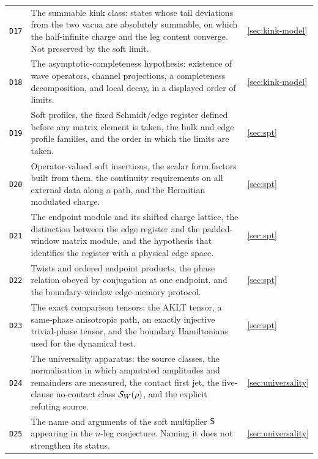 {\begin{longtable}{@{}p{}p{}p{}@{}}
\texttt{D17} & The summable kink class: states whose tail deviations from the
two vacua are absolutely summable, on which the half-infinite charge and the
leg content converge. Not preserved by the soft limit. & \cref{sec:kink-model}\\

\texttt{D18} & The asymptotic-completeness hypothesis: existence of wave
operators, channel projections, a completeness decomposition, and local decay,
in a displayed order of limits. & \cref{sec:kink-model}\\

\texttt{D19} & Soft profiles, the fixed Schmidt/edge register defined before
any matrix element is taken, the bulk and edge profile families, and the order
in which the limits are taken. & \cref{sec:spt}\\

\texttt{D20} & Operator-valued soft insertions, the scalar form factors built
from them, the continuity requirements on all external data along a path, and
the Hermitian modulated charge. & \cref{sec:spt}\\

\texttt{D21} & The endpoint module and its shifted charge lattice, the
distinction between the edge register and the padded-window matrix module, and
the hypothesis that identifies the register with a physical edge space. & \cref{sec:spt}\\

\texttt{D22} & Twists and ordered endpoint products, the phase relation
obeyed by conjugation at one endpoint, and the boundary-window edge-memory
protocol. & \cref{sec:spt}\\

\texttt{D23} & The exact comparison tensors: the AKLT tensor, a
same-phase anisotropic path, an exactly injective trivial-phase tensor, and
the boundary Hamiltonians used for the dynamical test. & \cref{sec:spt}\\

\texttt{D24} & The universality apparatus: the source classes, the
normalisation in which amputated amplitudes and remainders are measured, the
contact first jet, the five-clause no-contact class $\mathcal{S}_W(\rho)$, and the
explicit refuting source. & \cref{sec:universality}\\

\texttt{D25} & The name and arguments of the soft multiplier $\mathsf{S}$
appearing in the $n$-leg conjecture. Naming it does not strengthen its status. & \cref{sec:universality}\\


\end{longtable}}
